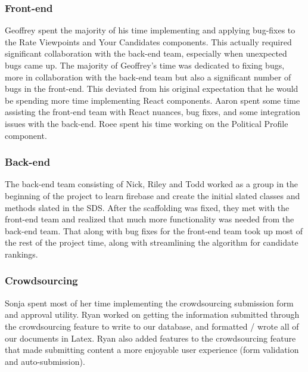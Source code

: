 \documentclass[11pt]{article}
\begin{document}
\subsubsection{Front-end}

Geoffrey spent the majority of his time implementing and applying bug-fixes to the Rate Viewpoints and Your Candidates components. This actually required significant collaboration with the back-end team, especially when unexpected bugs came up. The majority of Geoffrey's time was dedicated to fixing bugs, more in collaboration with the back-end team but also a significant number of bugs in the front-end. This deviated from his original expectation that he would be spending more time implementing React components. Aaron spent some time assisting the front-end team with React nuances, bug fixes, and some integration issues with the back-end. Roee spent his time working on the Political Profile component.

\subsubsection{Back-end}

The back-end team consisting of Nick, Riley and Todd worked as a group in the beginning of the project to learn firebase and create the initial slated classes and methods slated in the SDS. After the scaffolding was fixed, they met with the front-end team and realized that much more functionality was needed from the back-end team. That along with bug fixes for the front-end team took up most of the rest of the project time, along with streamlining the algorithm for candidate rankings.

\subsubsection{Crowdsourcing}

Sonja spent most of her time implementing the crowdsourcing submission form and approval utility. Ryan worked on getting the information submitted through the crowdsourcing feature to write to our database, and formatted / wrote all of our documents in Latex. Ryan also added features to the crowdsourcing feature that made submitting content a more enjoyable user experience (form validation and auto-submission).
\end{document}
